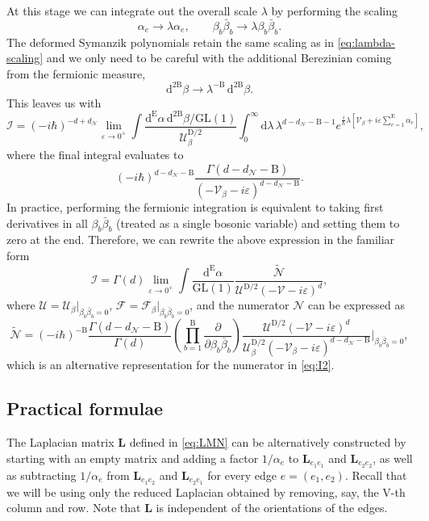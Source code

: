 \documentclass[12pt]{article}
\numberwithin{figure}{section}
\def \be {\begin{equation}}
\def \ee {\end{equation}}
\def \D {\mathrm{D}}
\def \E {\mathrm{E}}
\def \U {\mathcal{U}}
\def \F {\mathcal{F}}
\def \d {\mathrm{d}}
\def \eps {\varepsilon}
\def \V {\mathcal{V}}
\def \I {\mathcal{I}}
\def \GL {\mathrm{GL}}
\def \N {\mathcal{N}}
\def \VV {\mathrm{V}}
\def \B {\mathrm{B}}
\def \LL {\mathbf{L}}
\begin{document}
At this stage we can integrate out the overall scale $\lambda$ by performing the scaling
%
\be
\alpha_e \to \lambda \alpha_e, \qquad \beta_b\bar{\beta}_b \to \lambda \beta_b\bar{\beta}_b.
\ee
%
The deformed Symanzik polynomials retain the same scaling as in \eqref{eq:lambda-scaling} and we only need to be careful with the additional Berezinian coming from the fermionic measure,
%
\be
\d^{2\mathrm{B}} \beta \to \lambda^{-\mathrm{B}}\, \d^{2\mathrm{B}} \beta.
\ee
%
This leaves us with
%
\be
\I = (-i\hbar)^{-d+d_\N} \lim_{\eps \to 0^+} \int  \frac{\d^{\E}\alpha\, \d^{2\mathrm{B}}\beta / \GL(1)}{\U_\beta^{\D/2}} \int_0^\infty \d\lambda\, \lambda^{d - d_{\N} - \mathrm{B}-1} e^{\frac{i}{\hbar} \lambda [\V_\beta + i\eps \sum_{e=1}^{\E} \alpha_e ] },
\ee
%
where the final integral evaluates to
%
\be
(-i\hbar)^{d - d_\N - \mathrm{B}} \frac{\Gamma(d - d_\N - \mathrm{B})}{\left(-\V_\beta - i\eps\right)^{d - d_\N - \mathrm{B}}}.
\ee
%
In practice, performing the fermionic integration is equivalent to taking first derivatives in all $\beta_b\bar{\beta}_b$ (treated as a single bosonic variable) and setting them to zero at the end. Therefore, we can rewrite the above expression in the familiar form
%
\be
\I = \Gamma(d) \lim_{\eps \to 0^+} \int \frac{\d^{\E}\alpha}{\GL(1)} \frac{\widetilde{\N}}{\U^{\D/2} (-\V - i\eps)^{d}}, 
\ee
%
where $\U = \U_\beta|_{\beta_b\bar{\beta}_b = 0}$, $\F = \F_\beta|_{\beta_b\bar{\beta}_b = 0}$, and the numerator $\N$ can be expressed as
%
\be
\widetilde{\N} =  (-i\hbar)^{-\B}\frac{\Gamma(d - d_\N - \B)}{\Gamma(d)}  \left(\prod_{b=1}^{\B}  \frac{\partial}{\partial \beta_b \bar{\beta}_b} \right) \frac{\U^{\D/2} (-\V {-} i\eps)^{d}}{ \U_\beta^{\D/2} (-\V_\beta - i\eps)^{d-d_\N - \B}} \bigg|_{\beta_b \bar{\beta}_b = 0},
\ee
%
which is an alternative representation for the numerator in \eqref{eq:I2}.

\subsection{\label{app:practical}Practical formulae}

The Laplacian matrix $\LL$ defined in \eqref{eq:LMN} can be alternatively constructed by starting with an empty matrix and adding a factor $1/\alpha_e$ to $\LL_{e_1 e_1}$ and $\LL_{e_2 e_2}$, as well as subtracting $1/\alpha_e$ from $\LL_{e_1 e_2}$ and $\LL_{e_2 e_1}$ for every edge $e = (e_1, e_2)$. Recall that we will be using only the reduced Laplacian obtained by removing, say, the $\VV$-th column and row. Note that $\LL$ is independent of the orientations of the edges.
\end{document}
